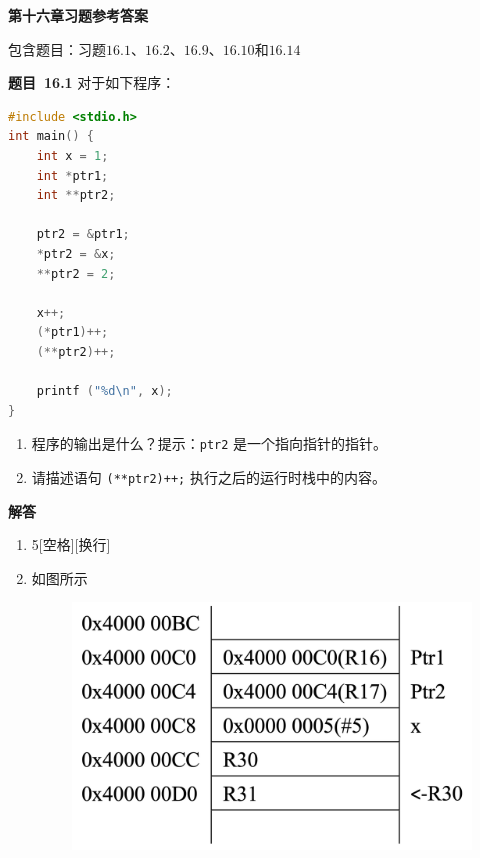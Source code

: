 \documentclass[10pt,a4paper,UTF8]{ctexart}
\newcommand{\problemname}{待定义}
\newenvironment{problem}{\begin{shaded}\par\noindent\textbf{题目\  \problemname}}{\end{shaded}\par}
\newenvironment{solution}{\par\noindent\textbf{解答}\ }{\par}
\begin{document}
\begin{center}
\LARGE\textbf{第十六章习题参考答案}
\end{center}

{\kaishu 包含题目：习题$16.1$、$16.2$、$16.9$、$16.10$和$16.14$}

\renewcommand{\problemname}{16.1}
\begin{problem}
	对于如下程序：
	\begin{lstlisting}[language=C]
#include <stdio.h> 
int main() { 
	int x = 1;	
	int *ptr1; 
	int **ptr2;

  	ptr2 = &ptr1; 
	*ptr2 = &x; 
	**ptr2 = 2; 

	x++; 
	(*ptr1)++; 
	(**ptr2)++; 

  	printf ("%d\n", x); 
} 
	\end{lstlisting}
	\begin{enumerate}[(1)]
		\item 程序的输出是什么？提示：\verb|ptr2| 是一个指向指针的指针。
		\item 请描述语句 \verb|(**ptr2)++;| 执行之后的运行时栈中的内容。	
	\end{enumerate}
\end{problem}

\begin{solution}
	\begin{enumerate}[(1)]
		\item 5[空格][换行]
		\item 如图所示
		\begin{figure}[H]
				\centering
				\includegraphics[scale=0.2]{img/16.1}
		\end{figure}
	\end{enumerate}
\end{solution}
\end{document}
